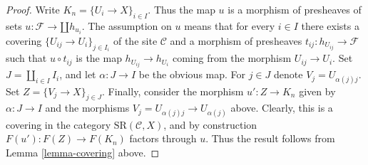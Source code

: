\documentclass[10pt,a4paper]{amsart}
\theoremstyle{plain}
\theoremstyle{definition}
\theoremstyle{remark}
\numberwithin{equation}{subsection}
\begin{document}
\begin{proof}
Write $K_n = \{U_i \to X\}_{i \in I}$.
Thus the map $u$ is a morphism of presheaves of sets
$u : \mathcal{F} \to \amalg h_{u_i}$.
The assumption on $u$ means that for every
$i \in I$ there exists a covering $\{U_{ij} \to U_i\}_{j \in I_i}$
of the site $\mathcal{C}$ and a morphism of presheaves
$t_{ij} : h_{U_{ij}} \to \mathcal{F}$ such that
$u \circ t_{ij}$ is the map $h_{U_{ij}} \to h_{U_i}$
coming from the morphism $U_{ij} \to U_i$.
Set $J = \amalg_{i \in I} I_i$, and let
$\alpha : J \to I$ be the obvious map.
For $j \in J$ denote $V_j = U_{\alpha(j)j}$. Set
$Z = \{V_j \to X\}_{j \in J}$.
Finally, consider the morphism
$u' : Z \to K_n$ given by $\alpha : J \to I$
and the morphisms $V_j = U_{\alpha(j)j} \to U_{\alpha(j)}$
above. Clearly, this is a covering in the
category $\text{SR}(\mathcal{C}, X)$, and by
construction $F(u') : F(Z) \to F(K_n)$ factors through $u$.
Thus the result follows from Lemma \ref{lemma-covering} above.
\end{proof}
\end{document}

